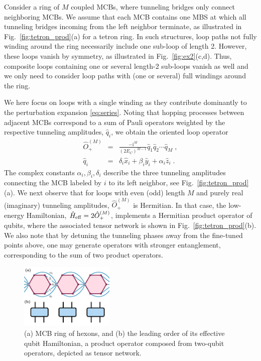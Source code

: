 \documentclass[twocolumn,floats,prx,showpacs]{revtex4-1}
\begin{document}
Consider a ring of $M$ coupled MCBs, where tunneling bridges only connect neighboring MCBs.  We assume that each MCB contains one MBS at which all tunneling bridges incoming from the left neighbor terminate, as illustrated in Fig.~\ref{fig:tetron_prod}(a) for a tetron ring. In such structures,  loop paths not fully winding around the ring necessarily include one sub-loop of length 2. However, these loops vanish by symmetry, as illustrated in Fig.~\ref{fig:ex2}(c,d). Thus, composite loops containing one or several length-2 sub-loops vanish as well and we only need to consider loop paths with (one or several) full windings around the ring.

We here focus on loops with a single winding as they contribute dominantly to the perturbation expansion \eqref{eq:series}. Noting that hopping processes between adjacent MCBs correspond to a sum of Pauli operators weighted by the respective tunneling amplitudes, $\hat q_i$, we obtain the oriented loop operator 
\begin{eqnarray}
\hat O_+^{(M)} &=& \frac{-\mathrm i^M}{(2E_C)^{M-1}} \hat q_1 \hat q_2 \cdots \hat q_M  \label{eq:prod} \;,\\ 
\hat q_i &=& \delta_i \hat x_i + \beta_i \hat y_i + \alpha_i \hat z_i \;.
\end{eqnarray}
The complex constants $\alpha_i,\beta_i,\delta_i$ describe the three tunneling amplitudes connecting the MCB labeled by $i$ to its left neighbor, see Fig.~\ref{fig:tetron_prod}(a). We next observe that for loops with even (odd) length $M$ and purely real (imaginary) tunneling amplitudes, $\hat O^{(M)}_+$ is Hermitian.  In that case, the low-energy Hamiltonian, $\hat H_{\rm eff}=2\hat O_+^{(M)}$, implements a Hermitian product 
operator of qubits, where
the associated tensor network is shown in Fig.~\ref{fig:tetron_prod}(b).
We also note that by detuning the tunneling phases away from the fine-tuned points above, one may generate operators with stronger entanglement, corresponding to the sum of two product operators. 

\begin{figure}
\includegraphics[width=0.4\textwidth]{fig/hexon_prod.pdf}
\caption{(a) MCB ring of hexons, and (b) the leading order of its effective qubit Hamiltonian, a product operator composed from two-qubit operators, depicted as tensor network.}
\label{fig:hexon_prod}
\end{figure}
\end{document}
